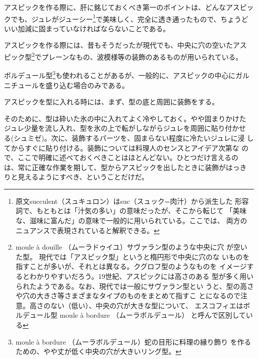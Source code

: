

アスピックを作る際に、肝に銘じておくべき第一のポイントは、どんなアスピッ
クでも、ジュレがジューシー\footnote{原文succulent（スュキュロン）はsuc（スュック=肉汁）から派生した
  形容詞で、もともとは「汁気の多い」の意味だったが、そこから転じて
  「美味な、滋味に富んだ」の意味で一般的に用いられている。ここでは、
  両方のニュアンスで表現されていると解釈できる。}で美味しく、完全に透き通ったもので、ちょうど
いい加減に固まっていなければならないことである。

アスピックを作る際には、昔もそうだったが現代でも、中央に穴の空いたアス
ピック型\footnote{moule à douille
  （ムーラドゥイユ）サヴァラン型のような中央に穴 が空いた型。
  現代では「アスピック型」というと楕円形で中央に穴のな
  いものを指すことが多いが、それとは異なる。クグロフ型のようなものを
  イメージするとわかりやすいだろう。19世紀、アスピックには高さのある
  型が多く用いられたようである。なお、現代では一般にサヴァラン型とい
  うと、型の高さや穴の大きさ等さまざまなタイプのものをまとめて指すこ
  とになるので注意。高さのない（低い）、中央の穴が大きな型について、
  エスコフィエはボルデュール型 moule à bordure （ムーラボルデュール）
  と呼んで区別している}でプレーンなもの、波模様等の装飾のあるものが用いられている。

ボルデュール型\footnote{moule à bordure
  （ムーラボルデュール）蛇の目形に料理の縁り飾り
  を作るための、やや丈が低く中央の穴が大きいリング型。}も使われることがあるが、一般的に、アスピックの中心にガル
ニチュールを盛り込む場合のみである。

アスピックを型に入れる時には、まず、型の底と周囲に装飾をする。

そのために、型は砕いた氷の中に入れてよく冷やしておく。やや固まりかけた
ジュレ少量を流し入れ、型を氷の上で転がしながらジュレを周囲に貼り付かせ
る(シュミゼ)。次に、装飾するパーツを、固まらない程度に冷たいジュレに浸
してからすぐに貼り付ける。装飾については料理人のセンスとアイデア次第な
ので、ここで明確に述べておくべきことはほとんどない。ひとつだけ言えるの
は、常に正確な作業を期して、型からアスピックを出したときに装飾がはっき
りと見えるようにすべき、ということだけだ。


